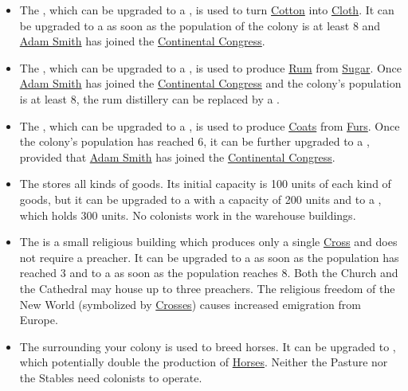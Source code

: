 \documentclass[12pt]{book}
\begin{document}
\begin{itemize}
\item The , which can be upgraded to a
  , is used to turn \hyperlink{Cotton}{Cotton}
  into \hyperlink{Cloth}{Cloth}. It can be upgraded to a
   as soon as the population of the colony is
  at least 8 and \hyperlink{Adam Smith}{Adam Smith} has joined the
  \hyperlink{Continental Congress}{Continental Congress}.

\item The , which can be upgraded to a
  , is used to produce \hyperlink{Rum}{Rum}
  from \hyperlink{Sugar}{Sugar}. Once \hyperlink{Adam Smith}{Adam
  Smith} has joined the \hyperlink{Continental Congress}{Continental
  Congress} and the colony's population is at least 8, the rum
  distillery can be replaced by a .

\item The , which can be upgraded to a
  , is used to produce
  \hyperlink{Coats}{Coats} from \hyperlink{Furs}{Furs}. Once the
  colony's population has reached 6, it can be further upgraded to a
  , provided that \hyperlink{Adam Smith}{Adam
  Smith} has joined the \hyperlink{Continental Congress}{Continental
  Congress}.

\item The  stores all kinds of goods. Its initial
  capacity is 100 units of each kind of goods, but it can be upgraded
  to a  with a capacity of 200 units and to a
  , which holds 300 units. No colonists
  work in the warehouse buildings.

\item The  is a small religious building which
  produces only a single \hyperlink{Crosses}{Cross} and does not
  require a preacher. It can be upgraded to a  as
  soon as the population has reached 3 and to a 
  as soon as the population reaches 8. Both the Church and the
  Cathedral may house up to three preachers. The religious freedom of
  the New World (symbolized by \hyperlink{Crosses}{Crosses}) causes
  increased emigration from Europe.

\item The  surrounding your colony is used to breed
  horses. It can be upgraded to , which potentially
  double the production of \hyperlink{Horses}{Horses}. Neither the
  Pasture nor the Stables need colonists to operate.

\end{itemize}
\end{document}

